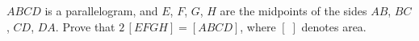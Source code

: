 $ABCD$ is a parallelogram, and $E$, $F$, $G$, $H$ are the midpoints of the sides $AB$, $BC$, $CD$, $DA$. Prove that $2\,[EFGH]=[ABCD]$, where $[\;]$ denotes area.
